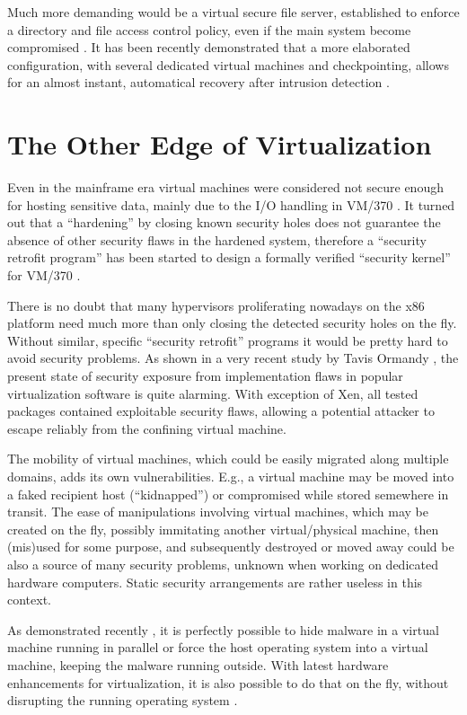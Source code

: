 \documentclass[11pt,a4paper]{llncs}
\begin{document}
Much more demanding would be a virtual secure file server, established to
enforce a directory and file access control policy, even if the main system 
become compromised \cite{ZBP05b}.
It has been recently demonstrated that a more elaborated configuration, with 
several dedicated virtual machines and checkpointing, allows for an almost 
instant, automatical recovery after intrusion detection \cite{CNIS05_170}.



\section{The Other Edge of Virtualization}


Even in the mainframe era virtual machines were considered not secure enough 
for hosting sensitive data, mainly due to the I/O handling in VM/370 
\cite{IBMSJ15_102}. It turned out that a ``hardening'' by closing known
security holes does not guarantee the absence of other security flaws in the
hardened system, therefore a ``security retrofit program'' has been started
to design a formally verified ``security kernel'' for VM/370 \cite{vm370srp}.

There is no doubt that many hypervisors proliferating nowadays on the x86
platform need much more than only closing the detected security holes on the
fly. Without similar, specific ``security retrofit'' programs it would be 
pretty hard to avoid security problems. 
As shown in a very recent study by Tavis Ormandy \cite{CSW07ormandy},  
the present state of security exposure from implementation flaws in popular 
virtualization software is quite alarming. With exception of Xen, all tested
packages contained exploitable security flaws, allowing a potential attacker 
to escape reliably from the confining virtual machine. 


The mobility of virtual machines, which could be easily migrated along multiple 
domains, adds its own vulnerabilities. E.g., a virtual machine may be moved 
into a faked recipient host (``kidnapped'') or compromised while stored 
semewhere in transit. 
The ease of manipulations involving virtual machines, which may be created
on the fly, possibly immitating another virtual/physical machine, then 
(mis)used for some purpose, and subsequently destroyed or moved away could 
be also a source of many security problems, unknown when working on dedicated 
hardware computers.
Static security arrangements are rather useless in this context.

As demonstrated recently \cite{King06}, it is perfectly possible to hide 
malware in a virtual machine running in parallel or force the host operating 
system into a virtual machine, keeping the malware running outside.
With latest hardware enhancements for virtualization, it is also possible
to do that on the fly, without disrupting the running operating system
\cite{BH2006JR,BH2006DDZ}.
\end{document}
